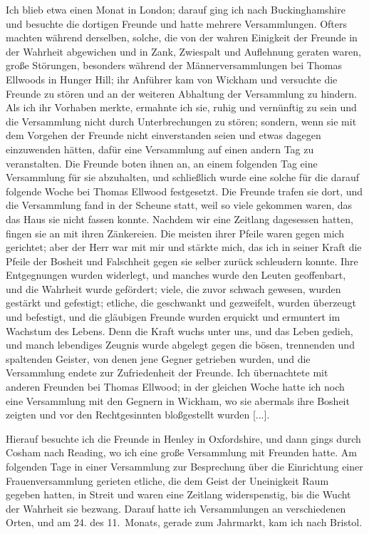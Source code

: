 Ich blieb etwa einen Monat in London; darauf ging ich
nach Buckinghamshire und besuchte die dortigen Freunde und
hatte mehrere Versammlungen. Ofters machten während derselben,
solche, die von der wahren Einigkeit der Freunde in der Wahrheit
abgewichen und in Zank, Zwiespalt und Auflehnung geraten
waren, große Störungen, besonders während der Männerversammlungen 
bei Thomas Ellwoods in Hunger Hill; ihr Anführer
kam von Wickham und versuchte die Freunde zu stören und
an der weiteren Abhaltung der Versammlung zu hindern. Als
ich ihr Vorhaben merkte, ermahnte ich sie, ruhig und vernünftig
zu sein und die Versammlung nicht durch Unterbrechungen zu
stören; sondern, wenn sie mit dem Vorgehen der Freunde nicht
einverstanden seien und etwas dagegen einzuwenden hätten, dafür
eine Versammlung auf einen andern Tag zu veranstalten. Die
Freunde boten ihnen an, an einem folgenden Tag eine Versammlung 
für sie abzuhalten, und schließlich wurde eine solche für die
darauf folgende Woche bei Thomas Ellwood festgesetzt. Die
Freunde trafen sie dort, und die Versammlung fand in der
Scheune statt, weil so viele gekommen waren, das das Haus sie
nicht fassen konnte. Nachdem wir eine Zeitlang dagesessen hatten,
fingen sie an mit ihren Zänkereien. Die meisten ihrer Pfeile
waren gegen mich gerichtet; aber der Herr war mit mir und
stärkte mich, das ich in seiner Kraft die Pfeile der Bosheit und
Falschheit gegen sie selber zurück schleudern konnte. Ihre 
Entgegnungen wurden widerlegt, und manches wurde den Leuten
geoffenbart, und die Wahrheit wurde gefördert; viele, die zuvor
schwach gewesen, wurden gestärkt und gefestigt; etliche, die 
geschwankt und gezweifelt, wurden überzeugt und befestigt, und die
gläubigen Freunde wurden erquickt und ermuntert im Wachstum
des Lebens. Denn die Kraft wuchs unter uns, und das Leben
gedieh, und manch lebendiges Zeugnis wurde abgelegt gegen die
bösen, trennenden und spaltenden Geister, von denen jene Gegner
getrieben wurden, und die Versammlung endete zur Zufriedenheit
der Freunde. Ich übernachtete mit anderen Freunden bei
Thomas Ellwood; in der gleichen Woche hatte ich noch eine 
Versammlung mit den Gegnern in Wickham, wo sie abermals ihre
Bosheit zeigten und vor den Rechtgesinnten bloßgestellt wurden [...].

Hierauf besuchte ich die Freunde in Henley in Oxfordshire,
und dann gings durch Cosham nach Reading, wo ich eine große
Versammlung mit Freunden hatte. Am folgenden Tage in einer
Versammlung zur Besprechung über die Einrichtung einer 
Frauenversammlung gerieten etliche, 
die dem Geist der Uneinigkeit Raum
gegeben hatten, in Streit und waren eine Zeitlang widerspenstig,
bis die Wucht der Wahrheit sie bezwang. Darauf hatte ich
Versammlungen an verschiedenen Orten, und am 24. des 
11.~Monats, gerade zum Jahrmarkt, kam ich nach Bristol.

